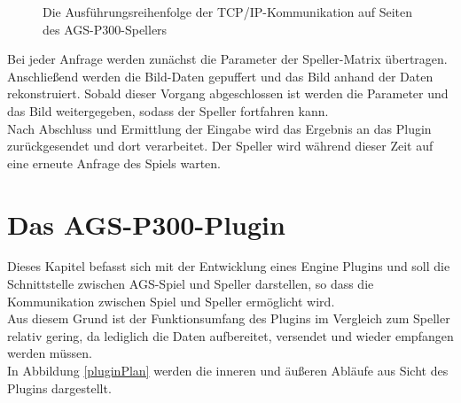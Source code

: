 \begin{figure}[h!]
\begin{center}
\begin{tikzpicture}
\end{tikzpicture}
\caption{Die Ausführungsreihenfolge der TCP/IP-Kommunikation auf Seiten des AGS-P300-Spellers}
\label{spellerplugintcpip}
\end{center}
\end{figure}

Bei jeder Anfrage werden zunächst die Parameter der Speller-Matrix übertragen. 
Anschließend werden die Bild-Daten gepuffert und das Bild anhand der Daten rekonstruiert.
Sobald dieser Vorgang abgeschlossen ist werden die Parameter und das Bild weitergegeben, sodass der Speller fortfahren kann.\\

Nach Abschluss und Ermittlung der Eingabe wird das Ergebnis an das Plugin zurückgesendet und dort verarbeitet.
Der Speller wird während dieser Zeit auf eine erneute Anfrage des Spiels warten.









\pagebreak
\section{Das AGS-P300-Plugin}

Dieses Kapitel befasst sich mit der Entwicklung eines Engine Plugins und soll die Schnittstelle zwischen AGS-Spiel und Speller darstellen,
so dass die Kommunikation zwischen Spiel und Speller ermöglicht wird.\\

Aus diesem Grund ist der Funktionsumfang des Plugins im Vergleich zum Speller relativ gering, da lediglich die Daten aufbereitet, versendet und wieder empfangen werden müssen.\\
In Abbildung \ref{pluginPlan} werden die inneren und äußeren Abläufe aus Sicht des Plugins dargestellt.\\




